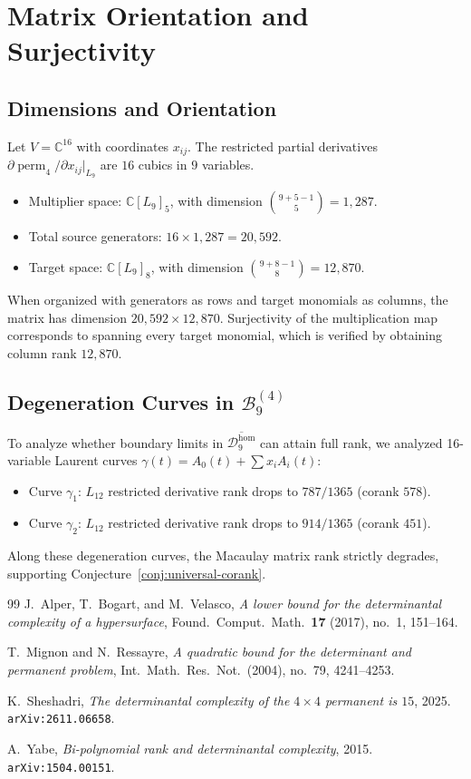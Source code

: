 \documentclass[11pt,a4paper]{amsart}
\newcommand{\perm}{\operatorname{perm}}
\newcommand{\CC}{\mathbb{C}}
\newcommand{\calD}{\mathcal{D}}
\newcommand{\calB}{\mathcal{B}}
\theoremstyle{definition}
\begin{document}
\section{Matrix Orientation and Surjectivity}

\subsection{Dimensions and Orientation}
Let $V = \CC^{16}$ with coordinates $x_{ij}$. The restricted partial derivatives
$\partial \perm_4 / \partial x_{ij}|_{L_9}$ are $16$ cubics in $9$ variables.
\begin{itemize}
  \item Multiplier space: $\CC[L_9]_5$, with dimension $\binom{9+5-1}{5} = 1{,}287$.
  \item Total source generators: $16 \times 1{,}287 = 20{,}592$.
  \item Target space: $\CC[L_9]_8$, with dimension $\binom{9+8-1}{8} = 12{,}870$.
\end{itemize}
When organized with generators as rows and target monomials as columns, the matrix
has dimension $20{,}592 \times 12{,}870$.
Surjectivity of the multiplication map corresponds to spanning every target monomial,
which is verified by obtaining column rank $12{,}870$.

\subsection{Degeneration Curves in $\calB_9^{(4)}$}
To analyze whether boundary limits in $\overline{\calD_9^{\mathrm{hom}}}$ can attain full rank,
we analyzed 16-variable Laurent curves $\gamma(t) = A_0(t) + \sum x_i A_i(t)$:
\begin{itemize}
  \item Curve $\gamma_1$: $L_{12}$ restricted derivative rank drops to $787/1365$ (corank $578$).
  \item Curve $\gamma_2$: $L_{12}$ restricted derivative rank drops to $914/1365$ (corank $451$).
\end{itemize}
Along these degeneration curves, the Macaulay matrix rank strictly degrades, supporting
Conjecture~\ref{conj:universal-corank}.

\begin{thebibliography}{99}
  J.~Alper, T.~Bogart, and M.~Velasco,
  \emph{A lower bound for the determinantal complexity of a hypersurface},
  Found.\ Comput.\ Math.\ \textbf{17} (2017), no.~1, 151--164.

  T.~Mignon and N.~Ressayre,
  \emph{A quadratic bound for the determinant and permanent problem},
  Int.\ Math.\ Res.\ Not.\ (2004), no.~79, 4241--4253.

  K.~Sheshadri,
  \emph{The determinantal complexity of the $4 \times 4$ permanent is $15$},
  2025.  \texttt{arXiv:2611.06658}.

  A.~Yabe,
  \emph{Bi-polynomial rank and determinantal complexity},
  2015.  \texttt{arXiv:1504.00151}.
\end{thebibliography}
\end{document}
